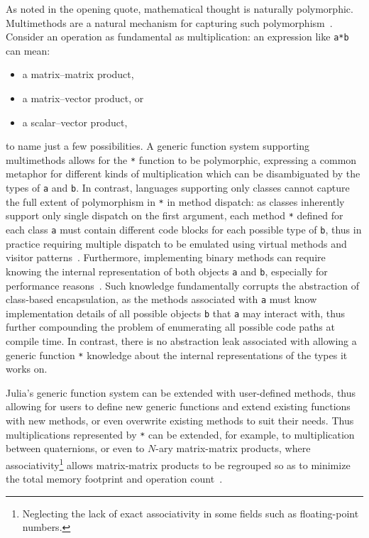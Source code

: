 \documentclass[pldi]{sigplanconf-pldi15}
\begin{document}
As \cite{Poincare1908} noted in the opening quote, mathematical thought is
naturally polymorphic. Multimethods are a natural mechanism for capturing such
polymorphism~\cite{Bezanson2014b,Chen2014}. Consider an operation as
fundamental as multiplication: an expression like \verb|a*b| can mean:

\begin{itemize}
	\item a matrix--matrix product,
	\item a matrix--vector product, or
	\item a scalar--vector product,
\end{itemize}
%
to name just a few possibilities. A generic function system supporting
multimethods allows for the \verb|*| function to be polymorphic, expressing a
common metaphor for different kinds of multiplication which can be
disambiguated by the types of \verb|a| and \verb|b|. In contrast, languages
supporting only classes cannot capture the full extent of polymorphism in
\verb|*| in method dispatch: as classes inherently support only single dispatch
on the first argument, each method \verb|*| defined for each class \verb|a|
must contain different code blocks for each possible type of \verb|b|, thus in
practice requiring multiple dispatch to be emulated using virtual methods and
visitor patterns~\cite{designpatterns}. Furthermore, implementing binary methods can
require knowing the internal representation of both objects \verb|a| and
\verb|b|, especially for performance reasons~\cite{Bruce1995}. Such knowledge
fundamentally corrupts the abstraction of class-based encapsulation, as the
methods associated with \verb|a| must know implementation details of all
possible objects \verb|b| that \verb|a| may interact with, thus further
compounding the problem of enumerating all possible code paths at compile time.
In contrast, there is no abstraction leak associated with allowing a generic
function \verb|*| knowledge about the internal representations of the types it
works on.

Julia's generic function system can be extended with user-defined methods, thus
allowing for users to define new generic functions and extend existing
functions with new methods, or even overwrite existing methods to suit their
needs. Thus multiplications represented by \verb|*| can be extended, for
example, to multiplication between quaternions, or even to $N$-ary
matrix-matrix products, where associativity\footnote{Neglecting the lack of
exact associativity in some fields such as floating-point numbers.} allows
matrix-matrix products to be regrouped so as to minimize the total memory
footprint and operation count~\cite{Hu1984}.
\end{document}

